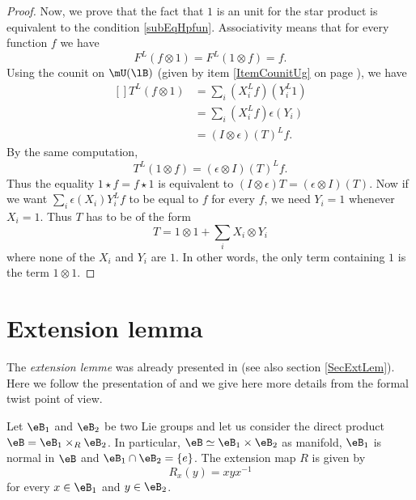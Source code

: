 \begin{proof}
	Now, we prove that the fact that $1$ is an unit for the star product is equivalent to the condition \eqref{subEqHpfun}. Associativity means that for every function $f$ we have
	\begin{equation}
		F^L(f\otimes 1)=F^L(1\otimes f)=f.
	\end{equation}
	Using the counit on $\mU(\lB)$ (given by item \ref{ItemCounitUg} on page \pageref{ItemCounitUg}), we have
	\begin{equation}
		\begin{aligned}[]
			T^L(f\otimes 1)&=\sum_i(X_i^Lf)(Y_i^L1)\\
			&=\sum_i(X_i^Lf)\epsilon(Y_i)\\
			&=(I\otimes \epsilon)(T)^Lf.
		\end{aligned}
	\end{equation}
	By the same computation,
	\begin{equation}
		T^L(1\otimes f)=(\epsilon\otimes I)(T)^Lf.
	\end{equation}
	Thus the equality $1\star f=f\star 1$ is equivalent to $(I\otimes\epsilon)T=(\epsilon\otimes I)(T)$. Now if we want $\sum_i\epsilon(X_i)Y_i^Lf$ to be equal to $f$ for every $f$, we need $Y_i=1$ whenever $X_i=1$. Thus $T$ has to be of the form
	\begin{equation}
		T=1\otimes 1+\sum_iX_i\otimes Y_i
	\end{equation}
	where none of the $X_i$ and $Y_i$ are $1$. In other words, the only term containing $1$ is the term $1\otimes 1$.
\end{proof}

\section{Extension lemma}		\label{SecExtenLemK}

The \emph{extension lemme} was already presented in \cite{These,articleBVCS} (see also section \ref{SecExtLem}). Here we follow the presentation of \cite{QuantifKhalerian} and we give here more details from the formal twist point of view.

Let $\eB_1$ and $\eB_2$ be two Lie groups and let us consider the direct product $\eB=\eB_1\times_R\eB_2$. In particular, $\eB\simeq\eB_1\times\eB_2$ as manifold, $\eB_1$ is normal in $\eB$ and $\eB_1\cap\eB_2=\{ e \}$. The extension map $R$ is given by
\begin{equation}
	R_x(y)=xyx^{-1}
\end{equation}
for every $x\in\eB_1$ and $y\in\eB_2$.

